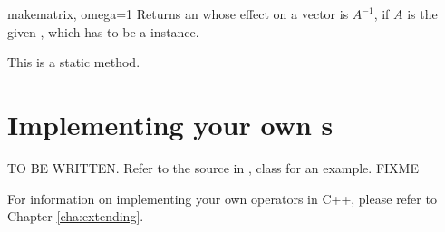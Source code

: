 \begin{methoddesc}{make}{matrix, omega=1}
  Returns an  whose effect on a vector is $A^{-1}$,
  if $A$ is the given , which has to be a 
   instance.

  This is a static method.
\end{methoddesc}

\section{Implementing your own s}

TO BE WRITTEN. Refer to the source in , 
class  for an example. FIXME

For information on implementing your own operators in C++, please
refer to Chapter \ref{cha:extending}.
